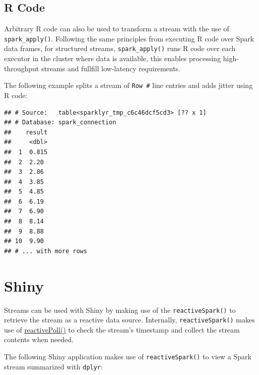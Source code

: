 \documentclass[]{book}
\newenvironment{Shaded}{\begin{snugshade}}{\end{snugshade}}
\newcommand{\KeywordTok}[1]{\textcolor[rgb]{0.13,0.29,0.53}{\textbf{#1}}}
\newcommand{\NormalTok}[1]{#1}
\newcommand{\OperatorTok}[1]{\textcolor[rgb]{0.81,0.36,0.00}{\textbf{#1}}}
\newcommand{\StringTok}[1]{\textcolor[rgb]{0.31,0.60,0.02}{#1}}
\theoremstyle{definition}
\theoremstyle{definition}
\theoremstyle{definition}
\theoremstyle{remark}
\begin{document}
\hypertarget{streams-r}{%
\subsection{R Code}\label{streams-r}}

Arbitrary R code can also be used to transform a stream with the use of
\texttt{spark\_apply()}. Following the same principles from executing R
code over Spark data frames, for structured streams,
\texttt{spark\_apply()} runs R code over each executor in the cluster
where data is available, this enables processing high-throughput streams
and fullfill low-latency requirements.

The following example splits a stream of \texttt{Row\ \#} line entries
and adds jitter using R code:

\begin{Shaded}
\end{Shaded}

\begin{verbatim}
## # Source:   table<sparklyr_tmp_c6c46dcf5cd3> [?? x 1]
## # Database: spark_connection
##    result
##     <dbl>
##  1  0.815
##  2  2.20 
##  3  2.86 
##  4  3.85 
##  5  4.85 
##  6  6.19 
##  7  6.90 
##  8  8.14 
##  9  8.88 
## 10  9.90 
## # ... with more rows
\end{verbatim}

\hypertarget{shiny}{%
\section{Shiny}\label{shiny}}

Streams can be used with Shiny by making use of the
\texttt{reactiveSpark()} to retrieve the stream as a reactive data
source. Internally, \texttt{reactiveSpark()} makes use of
\href{https://shiny.rstudio.com/reference/shiny/latest/reactivePoll.html}{reactivePoll()}
to check the stream's timestamp and collect the stream contents when
needed.

The following Shiny application makes use of \texttt{reactiveSpark()} to
view a Spark stream summarized with \texttt{dplyr}:
\end{document}
